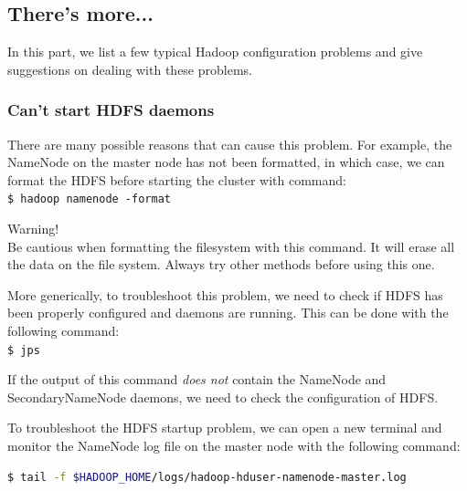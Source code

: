 \subsection*{There's more...}
In this part, we list a few typical Hadoop configuration problems and give suggestions on dealing with these problems.

\subsubsection*{Can't start HDFS daemons}
There are many possible reasons that can cause this problem. For example, the NameNode on the master node has not been formatted, in which case, we can format the HDFS before starting the cluster with command: \\
\verb|$ hadoop namenode -format|
\begin{warning}
Warning! \\
Be cautious when formatting the filesystem with this command. It will erase all the data on the file system. Always try other methods before using this one.
\end{warning}

More generically, to troubleshoot this problem, we need to check if HDFS has been properly configured and daemons are running. This can be done with the following command: \\
\verb|$ jps|

If the output of this command \emph{does not} contain the NameNode and SecondaryNameNode daemons, we need to check the configuration of HDFS.

To troubleshoot the HDFS startup problem, we can open a new terminal and monitor the NameNode log file on the master node with the following command:
\lstset{style=bashstyle}
\begin{lstlisting}[language=bash]
$ tail -f $HADOOP_HOME/logs/hadoop-hduser-namenode-master.log
\end{lstlisting}

